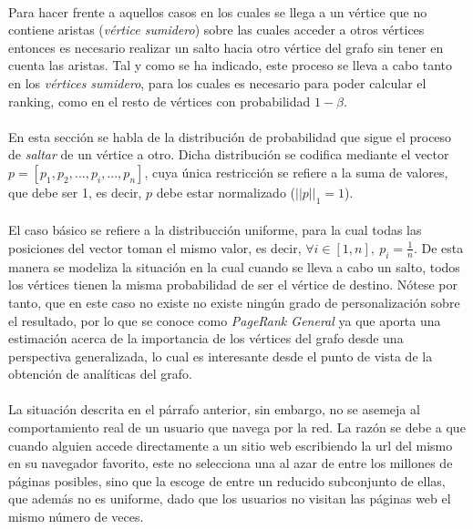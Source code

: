 \documentclass{subfiles}
\begin{document}
      \paragraph{}
      Para hacer frente a aquellos casos en los cuales se llega a un vértice que no contiene aristas (\emph{vértice sumidero}) sobre las cuales acceder a otros vértices entonces es necesario realizar un salto hacia otro vértice del grafo sin tener en cuenta las aristas. Tal y como se ha indicado, este proceso se lleva a cabo tanto en los \emph{vértices sumidero}, para los cuales es necesario para poder calcular el ranking, como en el resto de vértices con probabilidad $1-\beta$.

      \paragraph{}
      En esta sección se habla de la distribución de probabilidad que sigue el proceso de \emph{saltar} de un vértice a otro. Dicha distribución se codifica mediante el vector $p = [ p_1, p_2,...,p_i,...,p_n ]$, cuya única restricción se refiere a la suma de valores, que debe ser 1, es decir, $p$ debe estar normalizado ($||p||_1 = 1$).

      \paragraph{}
      El caso básico se refiere a la distribucción uniforme, para la cual todas las posiciones del vector toman el mismo valor, es decir, $\forall i \in [1,n], \ p_i = \frac{1}{n}$. De esta manera se modeliza la situación en la cual cuando se lleva a cabo un salto, todos los vértices tienen la misma probabilidad de ser el vértice de destino. Nótese por tanto, que en este caso no existe no existe ningún grado de personalización sobre el resultado, por lo que se conoce como \emph{PageRank General} ya que aporta una estimación acerca de la importancia de los vértices del grafo desde una perspectiva generalizada, lo cual es interesante desde el punto de vista de la obtención de analíticas del grafo.

      \paragraph{}
      La situación descrita en el párrafo anterior, sin embargo, no se asemeja al comportamiento real de un usuario que navega por la red. La razón se debe a que cuando alguien accede directamente a un sitio web escribiendo la url del mismo en su navegador favorito, este no selecciona una al azar de entre los millones de páginas posibles, sino que la escoge de entre un reducido subconjunto de ellas, que además no es uniforme, dado que los usuarios no visitan las páginas web el mismo número de veces.
\end{document}
